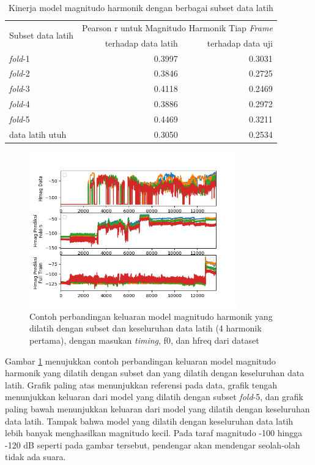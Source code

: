 \begin{table}[htbp]
    \centering
    \caption{Kinerja model magnitudo harmonik dengan berbagai subset data latih}\label{tab-mag-model-subset-results}
    \begin{tabular}{ |l|r|r| } 
     \hline
     \multirow{2}{*}{Subset data latih} & \multicolumn{2}{l|}{Pearson r untuk Magnitudo Harmonik Tiap \textit{Frame}} \\
     \cline{2-3}
     & terhadap data latih & terhadap data uji \\\hline
	\textit{fold}-1      &0.3997  &0.3031\\\hline
	\textit{fold}-2      &0.3846  &0.2725\\\hline
	\textit{fold}-3      &0.4118  &0.2469\\\hline
	\textit{fold}-4      &0.3886  &0.2972\\\hline
	\textit{fold}-5      &0.4469  &0.3211\\\hline
	data latih utuh    	 &0.3050  &0.2534\\\hline
    \end{tabular}
\end{table}

\begin{figure}[htbp]
    \centering
    \includegraphics[width=0.8\textwidth]{resources/Analisis_Hmag_subset.png}
    \caption{Contoh perbandingan keluaran model magnitudo harmonik yang dilatih dengan subset dan keseluruhan data latih (4 harmonik pertama), dengan masukan \textit{timing}, f0, dan hfreq dari dataset}\label{fig-hmag-subset-output-sample}
\end{figure}

Gambar \ref{fig-hmag-subset-output-sample} menujukkan contoh perbandingan keluaran model magnitudo harmonik yang dilatih dengan subset dan yang dilatih dengan keseluruhan data latih. Grafik paling atas menunjukkan referensi pada data, grafik tengah menunjukkan keluaran dari model yang dilatih dengan subset \textit{fold}-5, dan grafik paling bawah menunjukkan keluaran dari model yang dilatih dengan keseluruhan data latih. Tampak bahwa model yang dilatih dengan keseluruhan data latih lebih banyak menghasilkan magnitudo kecil. Pada taraf magnitudo -100 hingga -120 dB seperti pada gambar tersebut, pendengar akan mendengar seolah-olah tidak ada suara.

